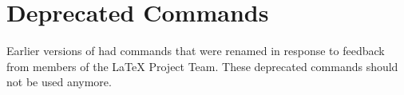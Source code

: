 \section{Deprecated Commands}

Earlier versions of  had commands that were renamed in
response to feedback from members of the \LaTeX{} Project Team. These deprecated
commands should not be used anymore.

%
%
\EndIndexGroup
%
\endinput


